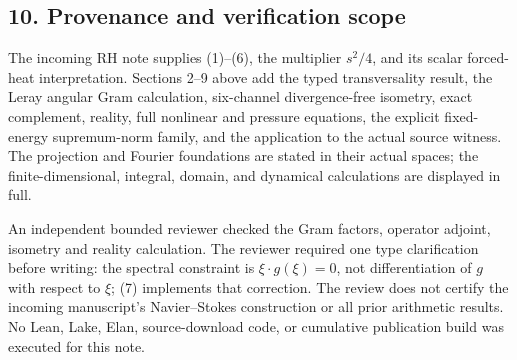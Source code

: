 \subsection{10. Provenance and verification scope}\label{provenance-and-verification-scope}

The incoming RH note supplies (1)--(6), the multiplier \(s^2/4\), and its scalar forced-heat interpretation. Sections 2--9 above add the typed transversality result, the Leray angular Gram calculation, six-channel divergence-free isometry, exact complement, reality, full nonlinear and pressure equations, the explicit fixed-energy supremum-norm family, and the application to the actual source witness. The projection and Fourier foundations are stated in their actual spaces; the finite-dimensional, integral, domain, and dynamical calculations are displayed in full.

An independent bounded reviewer checked the Gram factors, operator adjoint, isometry and reality calculation. The reviewer required one type clarification before writing: the spectral constraint is \(\xi\cdot g(\xi)=0\), not differentiation of \(g\) with respect to \(\xi\); (7) implements that correction. The review does not certify the incoming manuscript's Navier--Stokes construction or all prior arithmetic results. No Lean, Lake, Elan, source-download code, or cumulative publication build was executed for this note.
